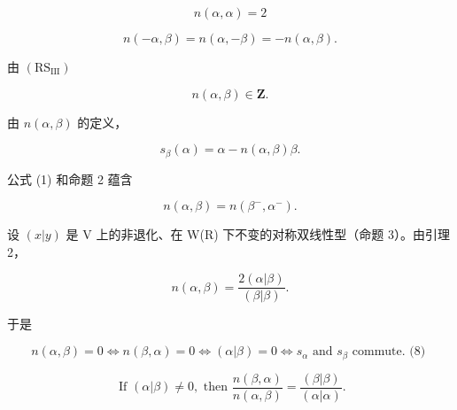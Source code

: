 \[
n (\alpha , \alpha) = 2\tag{2}
\]

\[
n (- \alpha , \beta) = n (\alpha , - \beta) = - n (\alpha , \beta).\tag{3}
\]

由 \((\mathrm{RS}_{\mathrm{III}})\)

\[
n (\alpha , \beta) \in \mathbf {Z}.\tag{4}
\]

由 \(n(\alpha, \beta)\) 的定义，

\[
s _ {\beta} (\alpha) = \alpha - n (\alpha , \beta) \beta .\tag{5}
\]

公式 (1) 和命题 2 蕴含

\[
n (\alpha , \beta) = n \left(\beta^ {-}, \alpha^ {-}\right).\tag{6}
\]

设 \((x|y)\) 是 V 上的非退化、在 W(R) 下不变的对称双线性型（命题 3）。由引理 2，

\[
n (\alpha , \beta) = \frac {2 (\alpha | \beta)}{(\beta | \beta)}.\tag{7}
\]

于是

\[
n (\alpha , \beta) = 0 \Longleftrightarrow n (\beta , \alpha) = 0 \Longleftrightarrow (\alpha | \beta) = 0 \Longleftrightarrow s _ {\alpha} \text {   and   } s _ {\beta} \text {   commute.   (8) }
\]

\[
\text {   If   } (\alpha | \beta) \neq 0, \text {   then   } \frac {n (\beta , \alpha)}{n (\alpha , \beta)} = \frac {(\beta | \beta)}{(\alpha | \alpha)}.\tag{9}
\]

